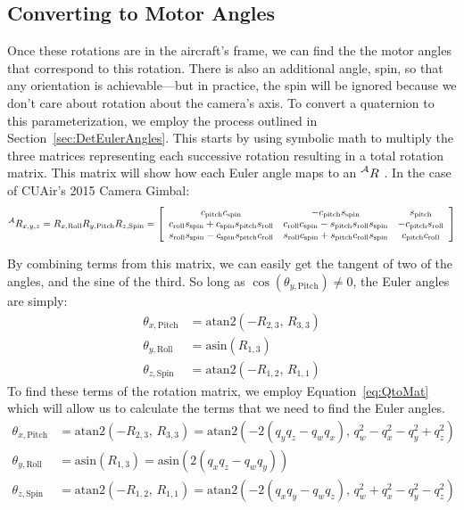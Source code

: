 \documentclass[letterpaper,10pt]{article}
\newcommand\leftidx[3]{%
  {\vphantom{#2}}#1#2#3%
}
\begin{document}
\subsection{Converting to Motor Angles}
\label{sec:MotorAngles}
Once these rotations are in the aircraft's frame, we can find the the motor angles that correspond to this rotation. There is also an additional angle, spin, so that any orientation is achievable---but in practice, the spin will be ignored because we don't care about rotation about the camera's axis. To convert a quaternion to this parameterization, we employ the process outlined in Section~\ref{sec:DetEulerAngles}. This starts by using symbolic math to multiply the three matrices representing each successive rotation resulting in a total rotation matrix. This matrix will show how each Euler angle maps to an $\leftidx{^\mathcal{A}}{R}$. In the case of CUAir's 2015 Camera Gimbal:
\begin{equation*}
\leftidx{^\mathcal{A}}{R}{_{x,y,z}} = R_{x,\text{Roll}} R_{y,\text{Pitch}} R_{z,\text{Spin}} = \left[\begin{array}{c c c} c_\text{pitch} c_\text{spin} & -c_\text{pitch} s_\text{spin} & s_\text{pitch} \\ c_\text{roll} s_\text{spin} + c_\text{spin} s_\text{pitch} s_\text{roll} & c_\text{roll} c_\text{spin} - s_\text{pitch} s_\text{roll} s_\text{spin} & -c_\text{pitch} s_\text{roll} \\ s_\text{roll} s_\text{spin} - c_\text{spin} s_\text{pitch} c_\text{roll} & s_\text{roll} c_\text{spin} + s_\text{pitch} c_\text{roll} s_\text{spin} & c_\text{pitch} c_\text{roll} \end{array} \right]
\end{equation*}

By combining terms from this matrix, we can easily get the tangent of two of the angles, and the sine of the third. So long as $\cos\!\left(\theta_{y,\text{Pitch}}\right) \neq 0$, the Euler angles are simply:
\begin{align*}
\theta_{x,\text{Pitch}} &= \mathrm{atan2}\!\left(-R_{2,3}, \, R_{3,3}\right) \\
\theta_{y,\text{Roll}} &= \mathrm{asin}\!\left(R_{1,3}\right) \\
\theta_{z,\text{Spin}} &= \mathrm{atan2}\!\left(-R_{1,2}, \, R_{1,1}\right)
\end{align*}
To find these terms of the rotation matrix, we employ Equation~\ref{eq:QtoMat} which will allow us to calculate the terms that we need to find the Euler angles.
\begin{align}
\theta_{x,\text{Pitch}} &= \mathrm{atan2}\!\left(-R_{2,3}, \, R_{3,3}\right) = \mathrm{atan2}\!\left(-2\left(q_y q_z - q_w q_x\right), \, q_w^2 - q_x^2 - q_y^2 + q_z^2\right) \\
\theta_{y,\text{Roll}} &= \mathrm{asin}\!\left(R_{1,3}\right) = \mathrm{asin}\!\left(2\left(q_x q_z - q_w q_y\right)\right) \\
\theta_{z,\text{Spin}} &= \mathrm{atan2}\!\left(-R_{1,2}, \, R_{1,1}\right) = \mathrm{atan2}\!\left(-2\left(q_x q_y - q_w q_z\right), \, q_w^2 +q_x^2 - q_y^2 - q_z^2\right)
\end{align}
\end{document}
